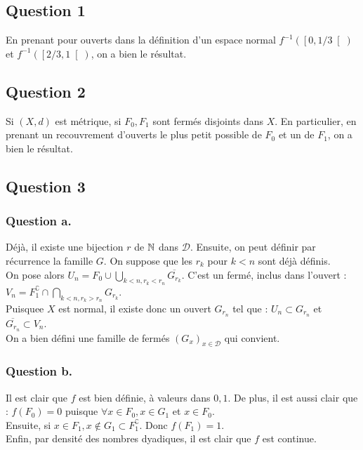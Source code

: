 \documentclass{cours}
\begin{document}
    \subsection{Question 1}
        En prenant pour ouverts dans la définition d'un espace normal $f^{-1}\left(\left[0, 1/3\right[\right)$ et $f^{-1}\left(\left[2/3, 1\right[\right)$, on a bien le résultat. 

    \subsection{Question 2}
        Si $(X, d)$ est métrique, si $F_{0}, F_{1}$ sont fermés disjoints dans $X$. En particulier, en prenant un recouvrement d'ouverts le plus petit possible de $F_0$ et un de $F_{1}$, on a bien le résultat.
    
    \subsection{Question 3}
        \subsubsection{Question a.}
            Déjà, il existe une bijection $r$ de $\mathbb{N}$ dans $\mathcal{D}$. Ensuite, on peut définir par récurrence la famille $G$. On suppose que les $r_{k}$ pour $k < n$ sont déjà définis. \\
            On pose alors $U_{n} = F_{0} \cup \bigcup\limits_{k < n, r_{k} < r_{n}} \overline{G_{r_{k}}}$. C'est un fermé, inclus dans l'ouvert : $V_{n} = F_{1}^{\complement} \cap \bigcap\limits_{k < n, r_{k} > r_{n}} G_{r_{k}}$.\\
            Puisquee $X$ est normal, il existe donc un ouvert $G_{r_{n}}$ tel que : $U_{n} \subset G_{r_{n}}$ et $ \overline{G_{r_{n}}} \subset V_{n}$.\\
            On a bien défini une famille de fermés $\left(G_{x}\right)_{x \in \mathcal{D}}$ qui convient. 
        
        \subsubsection{Question b.}
            Il est clair que $f$ est bien définie, à valeurs dans ${0, 1}$. 
            De plus, il est aussi clair que : $f\left(F_{0}\right) = 0$ puisque $\forall x \in F_{0}, x \in G_{1}$ et $x \in F_{0}$.\\
            Ensuite, si $x \in F_{1}, x \notin G_{1} \subset F_{1}^{\complement}$. Donc $f\left(F_{1}\right) = 1$.\\
            Enfin, par densité des nombres dyadiques, il est clair que $f$ est continue. 
\end{document}
